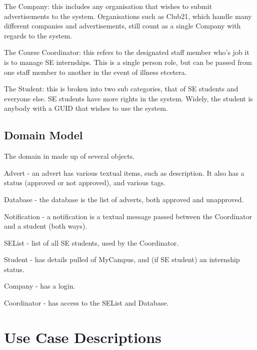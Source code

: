 \documentclass{l3deliverable}
\begin{document}
The Company: this includes any organisation that wishes to submit 
advertisements to the system. Organisations such as Club21, which handle
many different companies and advertisements, still count as a single Company
with regards to the system.

The Course Coordinator: this refers to the designated staff member who's job
it is to manage SE internships. This is a single person role, but can be 
passed from one staff member to another in the event of illness etcetera.

The Student: this is broken into two sub categories, that of SE students and
everyone else. SE students have more rights in the system. Widely, the student
is anybody with a GUID that wishes to use the system.


\subsection{Domain Model}


The domain in made up of several objects.

Advert - an advert has various textual items, such as description. It also
has a status (approved or not approved), and various tags.

Database - the database is the list of adverts, both approved and unapproved.

Notification - a notification is a textual message passed between the 
Coordinator and a student (both ways).

SEList - list of all SE students, used by the Coordinator. 

Student - has details pulled of MyCampus, and (if SE student) an internship 
status.

Company - has a login.

Coordinator - has access to the SEList and Database.


\section{Use Case Descriptions}

\end{document}
